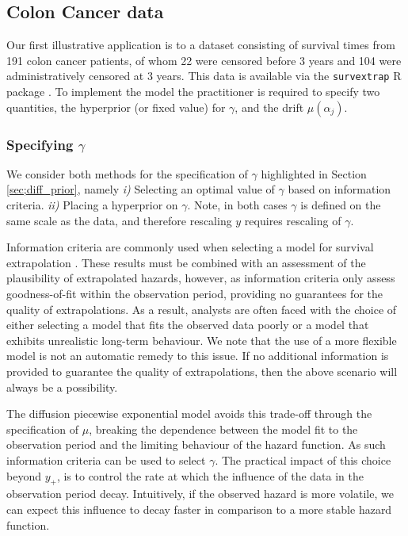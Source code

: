 \documentclass[ba,preprint]{imsart}
\theoremstyle{plain}
\theoremstyle{definition}
\theoremstyle{remark}
\begin{document}
\subsection{Colon Cancer data}
\label{sec;Colon}
Our first illustrative application is to a dataset consisting of survival times from 191 colon cancer patients, of whom 22 were censored before 3 years and 104 were administratively censored at 3 years. This data is available via the \texttt{survextrap} R package \citep{Jackson2023}. To implement the model the practitioner is required to specify two quantities, the hyperprior (or fixed value) for $\gamma$, and the drift $\mu(\alpha_j)$.

\subsubsection{Specifying $\gamma$}

We consider both methods for the specification of $\gamma$ highlighted in Section \ref{sec;diff_prior}, namely \textit{i)} Selecting an optimal value of $\gamma$ based on information criteria. \textit{ii)} Placing a hyperprior on $\gamma$. {\color{red}Note, in both cases $\gamma$ is defined on the same scale as the data, and therefore rescaling $y$ requires rescaling of $\gamma$.}

Information criteria are commonly used when selecting a model for survival extrapolation \citep{Baio2020}. These results must be combined with an assessment of the plausibility of extrapolated hazards, however, as information criteria only assess goodness-of-fit within the observation period, providing no guarantees for the quality of extrapolations. As a result, analysts are often faced with the choice of either selecting a model that fits the observed data poorly or a model that exhibits unrealistic long-term behaviour. We note that the use of a more flexible model is not an automatic remedy to this issue. If no additional information is provided to guarantee the quality of extrapolations, then the above scenario will always be a possibility.

The diffusion piecewise exponential model avoids this trade-off through the specification of $\mu$, breaking the dependence between the model fit to the observation period and the limiting behaviour of the hazard function. As such information criteria can be used to select $\gamma$. The practical impact of this choice beyond $y_+$, is to control the rate at which the influence of the data in the observation period decay. Intuitively, if the observed hazard is more volatile, we can expect this influence to decay faster in comparison to a more stable hazard function.
\end{document}
